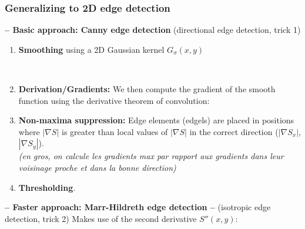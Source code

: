 \documentclass[a4paper,11pt]{article}
\begin{document}
\subsubsection{Generalizing to 2D edge detection}
\textbf{-- Basic approach: Canny edge detection} (directional edge detection, trick 1)
\begin{enumerate}
	\item \textbf{Smoothing} using a 2D Gaussian kernel $G_\sigma (x,y)$
		\begin{center}
		\vspace{5pt}\\
	\end{center}
	\item \textbf{Derivation/Gradients:} We then compute the gradient of the smooth function using the derivative theorem of convolution:
	\begin{center}
	\end{center}
	\item \textbf{Non-maxima suppression:} Edge elements (edgels) are placed in positions where $|\nabla S|$ is greater than local values of $|\nabla S|$ in the correct direction ($|\nabla S_x|$, $|\nabla S_y|$).\\
	\emph{(en gros, on calcule les gradients max par rapport aux gradients dans leur voisinage proche et dans la bonne direction)}
	\item \textbf{Thresholding}.
\end{enumerate}
\textbf{-- Faster approach: Marr-Hildreth edge detection --} (isotropic edge detection, trick 2)
Makes use of the second derivative $S''(x,y)$:
\begin{center}
\end{center}
\end{document}
